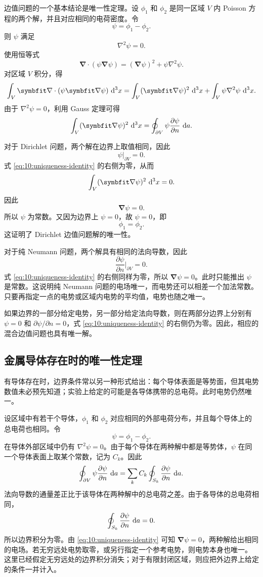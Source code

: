 边值问题的一个基本结论是唯一性定理。设 $\phi_{1}$ 和 $\phi_{2}$ 是同一区域 $V$ 内 Poisson 方程的两个解，并且对应相同的电荷密度。令
\[
\psi
=
\phi_{1}-\phi_{2}.
\]
则 $\psi$ 满足
\[
\nabla^{2}\psi=0.
\]
使用恒等式
\[
\bm{\nabla}\cdot(\psi\bm{\nabla}\psi)
=
(\bm{\nabla}\psi)^{2}
+
\psi\nabla^{2}\psi.
\]
对区域 $V$ 积分，得
\[
\int_{V}
\bm{\nabla}\cdot(\psi\bm{\nabla}\psi)\,\dif^{3}x
=
\int_{V}
(\bm{\nabla}\psi)^{2}\,\dif^{3}x
+
\int_{V}
\psi\nabla^{2}\psi\,\dif^{3}x.
\]
由于 $\nabla^{2}\psi=0$，利用 Gauss 定理可得
\begin{equation}
	\int_{V}
	(\bm{\nabla}\psi)^{2}\,\dif^{3}x
	=
	\oint_{\partial V}
	\psi
	\frac{\partial\psi}{\partial n}
	\,\dif a.
	\label{eq:10:uniqueness-identity}
\end{equation}

对于 Dirichlet 问题，两个解在边界上取值相同，因此
\[
\psi|_{\partial V}=0.
\]
式 \eqref{eq:10:uniqueness-identity} 的右侧为零，从而
\[
\int_{V}
(\bm{\nabla}\psi)^{2}\,\dif^{3}x=0.
\]
因此
\[
\bm{\nabla}\psi=0.
\]
所以 $\psi$ 为常数。又因为边界上 $\psi=0$，故 $\psi=0$，即
\[
\phi_{1}=\phi_{2}.
\]
这证明了 Dirichlet 边值问题解的唯一性。

对于纯 Neumann 问题，两个解具有相同的法向导数，因此
\[
\frac{\partial\psi}{\partial n}\bigg|_{\partial V}=0.
\]
式 \eqref{eq:10:uniqueness-identity} 的右侧同样为零，所以
$\bm{\nabla}\psi=0$。此时只能推出 $\psi$ 是常数。这说明纯 Neumann
问题的电场唯一，而电势还可以相差一个加法常数。只要再指定一点的电势或区域内电势的平均值，电势也随之唯一。

如果边界的一部分给定电势，另一部分给定法向导数，则在两部分边界上分别有
$\psi=0$ 和 $\partial\psi/\partial n=0$，式
\eqref{eq:10:uniqueness-identity} 的右侧仍为零。因此，相应的混合边值问题也具有唯一解。

\subsection{金属导体存在时的唯一性定理}

有导体存在时，边界条件常以另一种形式给出：每个导体表面是等势面，但其电势数值未必预先知道；实验上给定的可能是各导体携带的总电荷。此时电势仍然唯一。

设区域中有若干个导体，$\phi_{1}$ 和 $\phi_{2}$ 对应相同的外部电荷分布，并且每个导体上的总电荷也相同。令
\[
\psi=\phi_{1}-\phi_{2}.
\]
在导体外部区域中仍有 $\nabla^{2}\psi=0$。由于每个导体在两种解中都是等势体，$\psi$ 在同一个导体表面上取某个常数，记为 $C_{k}$。因此
\[
\oint_{\partial V}
\psi\frac{\partial\psi}{\partial n}\,\mathop{}\!\mathrm{d} a
=
\sum_{k}
C_{k}
\oint_{S_{k}}
\frac{\partial\psi}{\partial n}\,\mathop{}\!\mathrm{d} a.
\]
法向导数的通量差正比于该导体在两种解中的总电荷之差。由于各导体的总电荷相同，
\[
\oint_{S_{k}}
\frac{\partial\psi}{\partial n}\,\mathop{}\!\mathrm{d} a=0.
\]
所以边界积分为零。由 \eqref{eq:10:uniqueness-identity} 可知
$\bm{\nabla}\psi=0$，两种解给出相同的电场。若无穷远处电势取零，或另行指定一个参考电势，则电势本身也唯一。
这里已经假定无穷远处的边界积分消失；对于有限封闭区域，则应把外边界上给定的条件一并计入。

